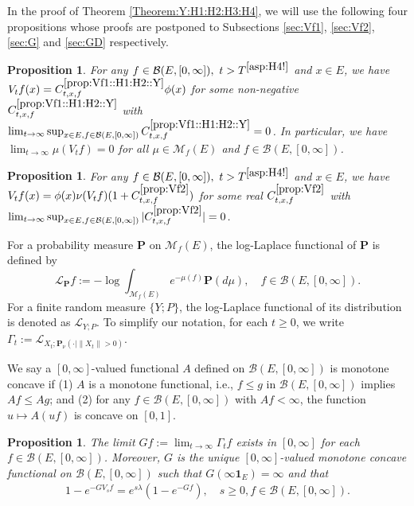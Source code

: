 \documentclass[12pt,a4paper]{amsart}
\numberwithin{equation}{section}
\theoremstyle{plain}
\newtheorem{prop}[thm]{Proposition}
\theoremstyle{definition}
\theoremstyle{remark}
\begin{document}
	In the  proof of Theorem \ref{Theorem:Y:H1:H2:H3:H4}, we will use the following four propositions whose proofs are postponed to Subsections \ref{sec:Vf1}, \ref{sec:Vf2}, \ref{sec:G} and \ref{sec:GD} respectively.

\begin{prop} \label{prop:Vf1::H1:H2::Y}
	For any $f\in \mathcal B(E, [0,\infty]),~t > T^{\eqref{asp:H4!}}$ and $x\in E$, we have $V_tf(x) = C^{\ref{prop:Vf1::H1:H2::Y}}_{t,x,f} \phi(x)$ for some non-negative $C_{t,x,f}^{\ref{prop:Vf1::H1:H2::Y}}$ with $\lim_{t\to \infty} \sup_{x\in E, f\in \mathcal B(E, [0,\infty])}  C^{\ref{prop:Vf1::H1:H2::Y}}_{t,x,f} = 0$.
	In particular, we have $\lim_{t\to \infty} \mu(V_tf)= 0 $ for all $\mu \in \mathcal M_f(E)$ and $f\in \mathcal B(E,[0,\infty])$.
\end{prop}

\begin{prop} \label{prop:Vf2}
	For any $f\in \mathcal B(E,[0,\infty]),~t>T^{\eqref{asp:H4!}}$ and $x\in E$, we have $V_tf(x) = \phi(x) \nu (V_tf) (1+C^{\ref{prop:Vf2}}_{t,x,f}) $ for some real $C^{\ref{prop:Vf2}}_{t,x,f}$ with
$\lim_{t\to \infty} \sup_{x\in E, f\in \mathcal B(E, [0,\infty])} |C^{\ref{prop:Vf2}}_{t,x,f}| = 0$.
\end{prop}

	For a probability measure $\mathbf P$ on $\mathcal M_f(E)$,
    the log-Laplace functional of $\mathbf P$ is defined by
	\[
	\mathscr L_\mathbf P f := - \log \int_{\mathcal M_f(E)}  e^{-\mu(f)} \mathbf P(d\mu), \quad
	f\in \mathcal B(E,[0,\infty]).
	\]
	For a finite random measure $\{Y; P\}$, the log-Laplace functional of its distribution is denoted as $\mathscr L_{Y;P}$.
	To simplify our notation, for each $t\geq 0$, we write $\Gamma_t := \mathscr L_{X_t;\mathbf P_\nu(\cdot | \|X_t\|>0)}$.

	We say a $[0,\infty]$-valued functional $A$ defined on $\mathcal B(E,[0,\infty])$ is monotone concave if
	(1) $A$ is a monotone functional, i.e., $f\leq g$ in $\mathcal B(E,[0,\infty])$ implies $Af \leq Ag$; and
	(2) for any $f\in \mathcal B(E,[0,\infty])$ with $Af< \infty$, the function $u \mapsto A(uf)$ is concave on $[0,1]$.

\begin{prop} \label{prop:G}
	The limit $Gf:= \lim_{t\to \infty} \Gamma_t f$ exists in $[0,\infty]$ for each $f\in \mathcal B(E,[0,\infty])$.
	Moreover, $G$ is the unique $[0,\infty]$-valued monotone concave functional on $\mathcal B(E,[0,\infty])$ such that %
	$G(\infty  \mathbf 1_E) = \infty$ and that
\begin{align} \label{eq:G.0}
	1 - e^{- GV_s f}
	= e^{s\lambda} (1 - e^{-Gf}),
	\quad s\geq 0, f\in \mathcal B(E,[0,\infty]).
\end{align}
\end{prop}
\end{document}
